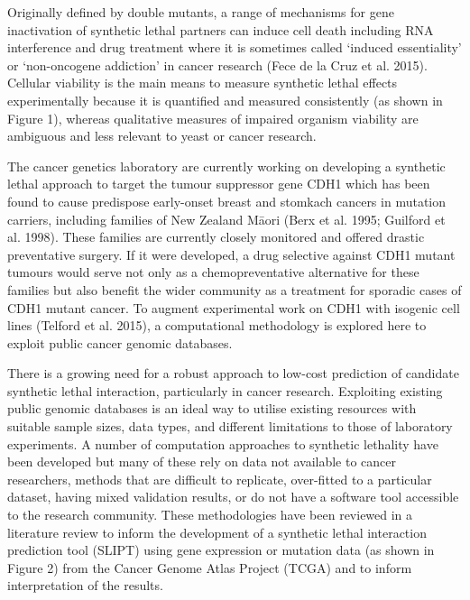 Originally defined by double mutants, a range of mechanisms for gene inactivation of synthetic lethal partners can induce cell death including RNA interference and drug treatment where it is sometimes called ‘induced essentiality’ or ‘non-oncogene addiction’ in cancer research (Fece de la Cruz et al. 2015).  Cellular viability is the main means to measure synthetic lethal effects experimentally because it is quantified and measured consistently (as shown in Figure 1), whereas qualitative measures of impaired organism viability are ambiguous and less relevant to yeast or cancer research.

The cancer genetics laboratory are currently working on developing a synthetic lethal approach to target the tumour suppressor gene CDH1 which has been found to cause predispose early-onset breast and stomkach cancers in mutation carriers, including families of New Zealand M\={a}ori (Berx et al. 1995; Guilford et al. 1998).  These families are currently closely monitored and offered drastic preventative surgery.  If it were developed, a drug selective against CDH1 mutant tumours would serve not only as a chemopreventative alternative for these families but also benefit the wider community as a treatment for sporadic cases of CDH1 mutant cancer.  To augment experimental work on CDH1 with isogenic cell lines (Telford et al. 2015), a computational methodology is explored here to exploit public cancer genomic databases.

There is a growing need for a robust approach to low-cost prediction of candidate synthetic lethal interaction, particularly in cancer research.  Exploiting existing public genomic databases is an ideal way to utilise existing resources with suitable sample sizes, data types, and different limitations to those of laboratory experiments.  A number of computation approaches to synthetic lethality have been developed but many of these rely on data not available to cancer researchers, methods that are difficult to replicate, over-fitted to a particular dataset, having mixed validation results, or do not have a software tool accessible to the research community.  These methodologies have been reviewed in a literature review to inform the development of a synthetic lethal interaction prediction tool (SLIPT) using gene expression or mutation data (as shown in Figure 2) from the Cancer Genome Atlas Project (TCGA) and to inform interpretation of the results.  
\fi